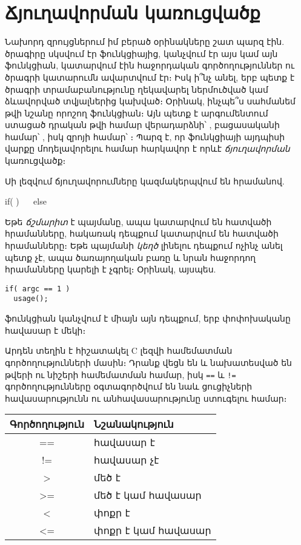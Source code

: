 \chapter{Ճյուղավորման կառուցվածք}

Նախորդ զրույցներում իմ բերած օրինակները շատ պարզ էին. ծրագիրը սկսվում
էր  ֆունկցիայից, կանչվում էր այս կամ այն ֆունկցիան, կատարվում
էին հաջորդական գործողություններ ու ծրագրի կատարումն ավարտվում էր։ Իսկ
ի՞նչ անել, երբ պետք է ծրագրի տրամաբանությունը ղեկավարել ներմուծված կամ
ձևավորված տվյալներից կախված։ Օրինակ, ինչպե՞ս սահմանեմ թվի նշանը որոշող
 ֆունկցիան։ Այն պետք է արգումենտում ստացած դրական թվի
համար վերադարձնի՝ , բացասականի համար՝ , իսկ զրոյի
համար՝ ։ Պարզ է, որ ֆունկցիայի այդպիսի վարքը մոդելավորելու համար  հարկավոր է որևէ \emph{ճյուղավորման} կառուցվածք։

Սի լեզվում ճյուղավորումները կազմակերպվում են  հրամանով.

\begin{syntax}
if(  )
~~
else
~~
\end{syntax}

Եթե \emph{ճշմարիտ} է  պայմանը, ապա կատարվում
են  հատվածի հրամանները, հակառակ դեպքում կատարվում
են  հատվածի հրամանները։ Եթե պայմանի \emph{կեղծ}
լինելու դեպքում ոչինչ անել պետք չէ, ապա  ծառայողական բառը
և նրան հաջորդող  հրամանները կարելի է չգրել։
Օրինակ, այսպես.

\begin{Verbatim}
if( argc == 1 )
  usage();
\end{Verbatim}

 ֆունկցիան կանչվում է միայն այն դեպքում, երբ 
փոփոխականը հավասար է մեկի։

Արդեն տեղին է հիշատակել C լեզվի համեմատման գործողությունների մասին։ Դրանք
վեցն են և նախատեսված են թվերի ու նիշերի համեմատման համար, իսկ \verb|==| և
\verb|!=| գործողությունները օգտագործվում են նաև ցուցիչների հավասարությունն
ու անհավասարությունը ստուգելու համար։

\begin{center}
\small
\begin{tabular}{c|l}
Գործողություն & Նշանակություն \\
\hline
== & հավասար է \\
!= & հավասար չէ \\
>  & մեծ է \\
>= & մեծ է կամ հավասար \\
<  & փոքր է \\
<= & փոքր է կամ հավասար \\
\end{tabular}
\end{center}

